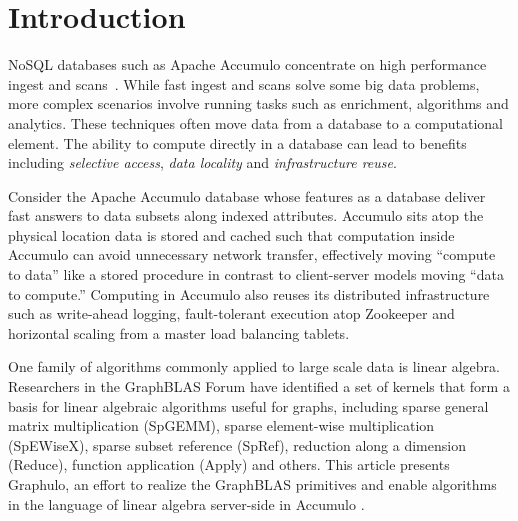 
\section{Introduction}
\label{sIntro}
% 


NoSQL databases such as Apache Accumulo
concentrate on high performance ingest and scans~\cite{sen2013benchmarking}. 
While fast ingest and scans solve some big data problems,
more complex scenarios involve running tasks
such as enrichment, algorithms and analytics. These techniques
often move data from a database %
to a computational element. The ability to
compute directly in a database can lead to benefits including 
\emph{selective access}, \emph{data locality} and \emph{infrastructure reuse}. 

Consider the Apache Accumulo database whose features as a database deliver
fast answers to data subsets along indexed attributes. 
Accumulo sits atop the physical location data is stored and cached
such that computation inside Accumulo can avoid unnecessary network transfer,
effectively moving ``compute to data'' like a stored procedure
in contrast to client-server models moving ``data to compute.''
Computing in Accumulo also reuses its distributed infrastructure
such as write-ahead logging, fault-tolerant execution atop Zookeeper and 
horizontal scaling from a master load balancing tablets.

One family of algorithms commonly applied to large scale data is linear algebra.
Researchers in the GraphBLAS Forum \cite{mattson2014standards} 
have identified a set of kernels
that form a basis for linear algebraic algorithms useful for graphs, including 
sparse general matrix multiplication (SpGEMM), sparse element-wise multiplication (SpEWiseX),
sparse subset reference (SpRef), reduction along a dimension (Reduce),
function application (Apply) and others.
This article presents Graphulo, an effort to realize the GraphBLAS primitives 
and enable algorithms in the language of linear algebra server-side in Accumulo \cite{gadepally2015gabb}.

